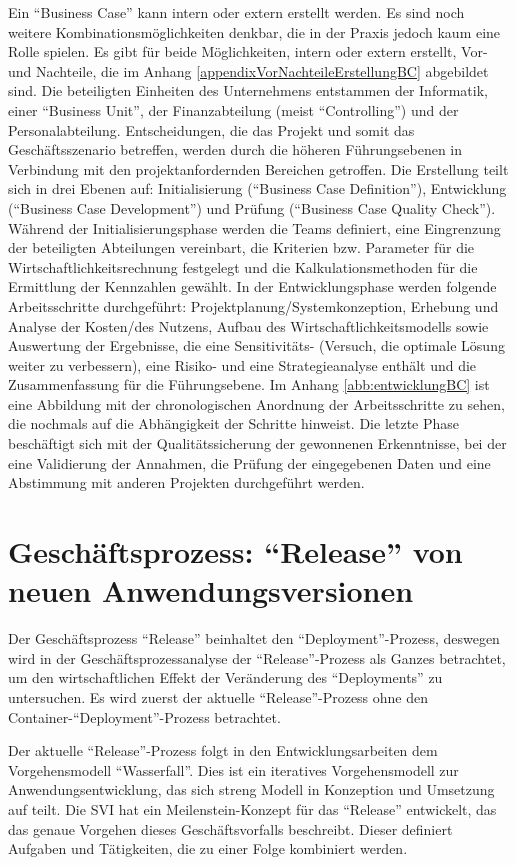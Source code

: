 Ein \enquote{Business Case} kann intern oder extern erstellt werden. Es sind noch weitere Kombinationsmöglichkeiten denkbar, die in der Praxis jedoch kaum eine Rolle spielen.\autocite[vgl.][S.\,33]{brugger_it_2009} Es gibt für beide Möglichkeiten, intern oder extern erstellt, Vor- und Nachteile, die im Anhang \vref{appendixVorNachteileErstellungBC} abgebildet sind. Die beteiligten Einheiten des Unternehmens entstammen der Informatik, einer \enquote{Business Unit}, der Finanzabteilung (meist \enquote{Controlling}) und der Personalabteilung. Entscheidungen, die das Projekt und somit das Geschäftsszenario betreffen, werden durch die höheren Führungsebenen in Verbindung mit den projektanfordernden Bereichen getroffen. Die Erstellung teilt sich in drei Ebenen auf: Initialisierung (\enquote{Business Case Definition}), Entwicklung (\enquote{Business Case Development}) und Prüfung (\enquote{Business Case Quality Check}).\autocite[vgl.][S.\,41-42]{brugger_it_2009} Während der Initialisierungsphase werden die Teams definiert, eine Eingrenzung der beteiligten Abteilungen vereinbart, die Kriterien bzw. Parameter für die Wirtschaftlichkeitsrechnung festgelegt und die Kalkulationsmethoden für die Ermittlung der Kennzahlen gewählt. In der Entwicklungsphase werden folgende Arbeitsschritte durchgeführt: Projektplanung/Systemkonzeption, Erhebung und Analyse der Kosten/des Nutzens, Aufbau des Wirtschaftlichkeitsmodells sowie Auswertung der Ergebnisse, die eine Sensitivitäts- (Versuch, die optimale Lösung weiter zu verbessern), eine Risiko- und eine Strategieanalyse enthält und die Zusammenfassung für die Führungsebene. Im Anhang \vref{abb:entwicklungBC} ist eine Abbildung mit der chronologischen Anordnung der Arbeitsschritte zu sehen, die nochmals auf die Abhängigkeit der Schritte hinweist. Die letzte Phase beschäftigt sich mit der Qualitätssicherung der gewonnenen Erkenntnisse, bei der eine Validierung der Annahmen, die Prüfung der eingegebenen Daten und eine Abstimmung mit anderen Projekten durchgeführt werden. 

\section{Geschäftsprozess: \enquote{Release} von neuen Anwendungsversionen}
Der Geschäftsprozess \enquote{Release} beinhaltet den \enquote{Deployment}-Prozess, deswegen wird in der Geschäftsprozessanalyse der \enquote{Release}-Prozess als Ganzes betrachtet, um den wirtschaftlichen Effekt der Veränderung des \enquote{Deployments} zu untersuchen. Es wird zuerst der aktuelle \enquote{Release}-Prozess  ohne den Container-\enquote{Deployment}-Prozess betrachtet.
\par
Der aktuelle \enquote{Release}-Prozess folgt in den Entwicklungsarbeiten dem Vorgehensmodell \enquote{Wasserfall}. Dies ist ein iteratives Vorgehensmodell zur Anwendungsentwicklung, das sich streng Modell in Konzeption und Umsetzung auf teilt.\autocite[vgl.][S.\,24]{freund_praxishandbuch_2017} Die \ac{SVI} hat ein Meilenstein-Konzept für das \enquote{Release} entwickelt, das das genaue Vorgehen dieses Geschäftsvorfalls beschreibt. Dieser definiert Aufgaben und Tätigkeiten, die zu einer Folge kombiniert werden. 

